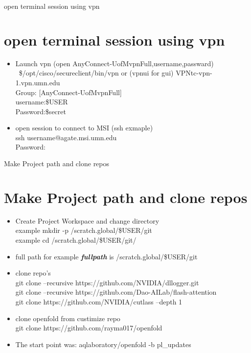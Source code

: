 \documentclass[xcolor = svgnames,hyperref = {colorlinks = true},]{beamer}
\newcommand{\sectframe}[1]{\begin{frame}{#1}
		\section{#1}
}
\begin{document}
\sectframe{open terminal session using vpn}
	\begin{tcolorbox}[colback=blue!5!white,colframe=blue!75!black]
	\begin{itemize}{}
	\item{Launch vpn (open AnyConnect-UofMvpnFull,username,passward)}
{\color{red}~\$}/opt/cisco/secureclient/bin/vpn or (vpnui for gui)
{\color{cyan}VPN}tc-vpn-1.vpn.umn.edu\\
{\color{cyan}Group:} [AnyConnect-UofMvpnFull]\\
{\color{cyan}username:}\$USER\\ 
{\color{cyan}Password:}\$secret \\	
	\item{open session to connect to MSI (ssh exmaple) }\\
ssh username@agate.msi.umn.edu\\
{\color{cyan}Password:}
\end{itemize}
\end{tcolorbox}
\end{frame}


\sectframe{Make Project path and clone repos}
\begin{tcolorbox}[colback=blue!5!white,colframe=blue!75!black]
	\begin{itemize}{}
		\item{Create Project Workspace and change directory}\\
		 example mkdir -p /scratch.global/\$USER/git\\
		 example cd /scratch.global/\$USER/git/
		\item{full path for example}
		\textbf{\textit{fullpath}} is /scratch.global/\$USER/git 
		\item{clone repo's}\\
git clone --recursive https://github.com/NVIDIA/dllogger.git\\	
git clone --recursive https://github.com/Dao-AILab/flash-attention\\
git clone https://github.com/NVIDIA/cutlass --depth 1
		\item{clone openfold from custimize repo}\\
git clone https://github.com/rayma017/openfold
		\item{The start point was: aqlaboratory/openfold -b pl\_updates }	
	\end{itemize}
\end{tcolorbox}
\end{frame}
\end{document}
